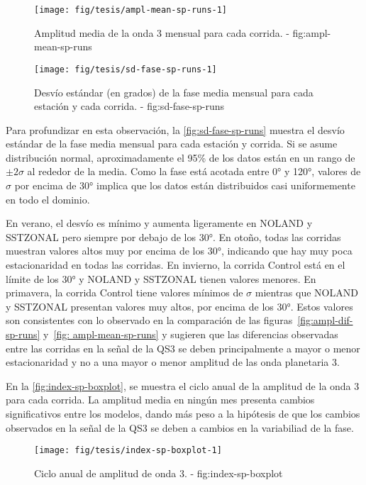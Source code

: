 \documentclass[spanish,a4paper,12p]{book}
\begin{document}
\begin{figure*}
\texttt{[image: fig/tesis/ampl-mean-sp-runs-1]} \caption{Amplitud media de la onda 3 mensual para cada corrida. - fig:ampl-mean-sp-runs}\label{fig:ampl-mean-sp-runs}
\end{figure*}

\begin{figure*}
\texttt{[image: fig/tesis/sd-fase-sp-runs-1]} \caption{Desvío estándar (en grados) de la fase media mensual para cada estación y cada corrida. - fig:sd-fase-sp-runs}\label{fig:sd-fase-sp-runs}
\end{figure*}

Para profundizar en esta observación, la \autoref{fig:sd-fase-sp-runs}
muestra el desvío estándar de la fase media mensual para cada estación y
corrida. Si se asume distribución normal, aproximadamente el 95\% de los
datos están en un rango de \(\pm 2\sigma\) al rededor de la media. Como
la fase está acotada entre 0° y 120°, valores de \(\sigma\) por encima
de 30° implica que los datos están distribuidos casi uniformemente en
todo el dominio.

En verano, el desvío es mínimo y aumenta ligeramente en NOLAND y
SSTZONAL pero siempre por debajo de los 30°. En otoño, todas las
corridas muestran valores altos muy por encima de los 30°, indicando que
hay muy poca estacionaridad en todas las corridas. En invierno, la
corrida Control está en el límite de los 30° y NOLAND y SSTZONAL tienen
valores menores. En primavera, la corrida Control tiene valores mínimos
de \(\sigma\) mientras que NOLAND y SSTZONAL presentan valores muy
altos, por encima de los 30°. Estos valores son consistentes con lo
observado en la comparación de las figuras~\ref{fig:ampl-dif-sp-runs}
y~\ref{fig: ampl-mean-sp-runs} y sugieren que las diferencias observadas
entre las corridas en la señal de la QS3 se deben principalmente a mayor
o menor estacionaridad y no a una mayor o menor amplitud de las onda
planetaria 3.

En la \autoref{fig:index-sp-boxplot}, se muestra el ciclo anual de la
amplitud de la onda 3 para cada corrida. La amplitud media en ningún mes
presenta cambios significativos entre los modelos, dando más peso a la
hipótesis de que los cambios observados en la señal de la QS3 se deben a
cambios en la variabiliad de la fase.

\begin{figure*}
\texttt{[image: fig/tesis/index-sp-boxplot-1]} \caption{Ciclo anual de amplitud de onda 3. - fig:index-sp-boxplot}\label{fig:index-sp-boxplot}
\end{figure*}
\end{document}
